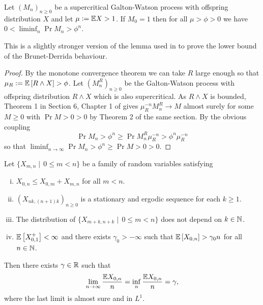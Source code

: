 \begin{lemma}\label{lem:ExpTailsGW}
Let $(M_n)_{n \geq 0}$ be a supercritical Galton-Watson process with offspring distribution $X$ and let $\mu \vcentcolon= \mathbb{E} X > 1$. If $M_0 = 1$ then for all $\mu > \phi > 0$ we have $0 < \liminf_n \Pr{M_n > \phi^n}$. 
\end{lemma}

\begin{remark}
This is a slightly stronger version of the lemma used in \cite{exp_tails} to prove the lower bound of the Brunet-Derrida behaviour.  
\end{remark}

\begin{proof}
By the monotone convergence theorem we can take $R$ large enough so that $\mu_R \vcentcolon= \mathbb{E}\left[ R \land X \right] > \phi$. Let $(M^R_n)_{n \geq 0}$ be the Galton-Watson process with offspring distribution $R \land X$ which is also supercritical. As $R \land X$ is bounded, Theorem 1 in Section 6, Chapter 1 of \cite{athreya2004branching} gives $\mu_R^{-n} M^R_n \to M$ almost surely for some $M \geq 0$ with $\Pr{M > 0} > 0$ by Theorem 2 of the same section. By the obvious coupling 
\begin{equation}\nonumber
\Pr{M_n > \phi^n} \geq \Pr{M^R_n \mu_R^{-n} > \phi^n \mu_R^{-n}}
\end{equation}
so that $\liminf_{n \to \infty} \Pr{M_n > \phi^n} \geq \Pr{M > 0} > 0$. 
\end{proof}

\begin{theorem}
Let $\{X_{m,n} \mid\, 0 \leq m < n\}$ be a family of random variables satisfying 
\begin{enumerate}[(i)]
\item $X_{0,n} \leq X_{0,m} + X_{m, n}$ for all $m < n$. 
\item $(X_{nk, (n+1)k})_{n \geq 0}$ is a stationary and ergodic sequence for each $k \geq 1$. 
\item The distribution of $\{X_{m + k, n + k} \mid\, 0 \leq m < n\}$ does not depend on $k \in \mathbb{N}$. 
\item $\mathbb{E}\left[ X_{0,1}^+ \right] < \infty$ and there exists $\gamma_0 > -\infty$ such that $\mathbb{E}\left[ X_{0,n} \right] > \gamma_0 n$ for all $n \in \mathbb{N}$. 
\end{enumerate}
Then there exists $\gamma \in \mathbb{R}$ such that 
\begin{equation}\nonumber
\lim\limits_{n \to \infty} \frac{\mathbb{E} X_{0, n}}{n} = \inf\limits_{n} \frac{\mathbb{E} X_{0,n}}{n} = \gamma, 
\end{equation}
where the last limit is almost sure and in $L^1$. 
\end{theorem}


